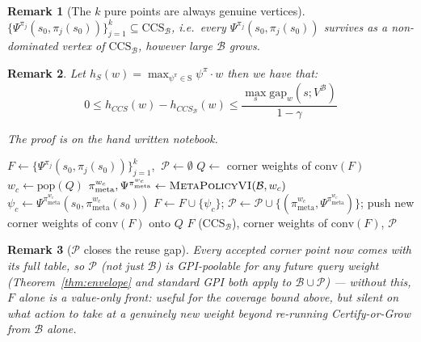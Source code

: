 \documentclass[11pt]{article}
\newtheorem{remark}{Remark}
\begin{document}
\begin{remark}[The $k$ pure points are always genuine vertices]\label{prop:seed}
$\{\Psi^{\pi_j}(s_0,\pi_j(s_0))\}_{j=1}^k\subseteq\mathrm{CCS}_{\mathcal B}$, i.e.\ every $\Psi^{\pi_j}(s_0,\pi_j(s_0))$
survives as a non-dominated vertex of $\mathrm{CCS}_{\mathcal B}$, however large $\mathcal B$ grows.
\end{remark}

\begin{remark}
    Let $h_{S}(w) = \max_{\psi^\pi \in \text{S}} \psi^\pi \cdot w$ then we have that: 
    \begin{equation*}
        0 \leq h_{CCS}(w) - h_{CCS_\mathcal{B}}(w) \leq \frac{\max_s \text{gap}_w (s ; V^\mathcal{B})}{1 - \gamma}
    \end{equation*}

    The proof is on the hand written notebook. 
\end{remark}

\begin{algorithm}[H]
\caption{\textsc{Get $CCS_\mathcal{B}$}}\label{alg:get-ccs}
\begin{algorithmic}[1]
\State $F\gets\{\Psi^{\pi_j}(s_0,\pi_j(s_0))\}_{j=1}^k$, $\ \mathcal P\gets\emptyset$ 
\State $Q\gets$ corner weights of $\mathrm{conv}(F)$
    \State $w_c\gets\mathrm{pop}(Q)$
    \State $\pi^{w_c}_{\mathrm{meta}},\Psi^{\pi^{w_c}_{\mathrm{meta}}}\gets\textsc{MetaPolicyVI}(\mathcal B,w_c)$ 
    \State $\psi_c\gets\Psi^{\pi^{w_c}_{\mathrm{meta}}}(s_0,\pi^{w_c}_{\mathrm{meta}}(s_0))$
        \State $F\gets F\cup\{\psi_c\}$; $\mathcal P\gets\mathcal P\cup\{(\pi^{w_c}_{\mathrm{meta}},\Psi^{\pi^{w_c}_{\mathrm{meta}}})\}$; push new corner weights of $\mathrm{conv}(F)$ onto $Q$
    \EndIf
\EndWhile
\State \Return $F$ ($\mathrm{CCS}_{\mathcal{B}}$), corner weights of $\mathrm{conv}(F)$, $\mathcal P$
\end{algorithmic}
\end{algorithm}

\begin{remark}[$\mathcal P$ closes the reuse gap]\label{rem:pool-closes-gap}
Every accepted corner point now comes with its full table, so $\mathcal P$ (not just $\mathcal B$) is GPI-poolable
for any future query weight (Theorem~\ref{thm:envelope} and standard GPI both apply to $\mathcal B\cup\mathcal P$) —
without this, $F$ alone is a value-only front: useful for the coverage bound above, but silent on what action to
take at a genuinely new weight beyond re-running Certify-or-Grow from $\mathcal B$ alone.
\end{remark}
\end{document}
